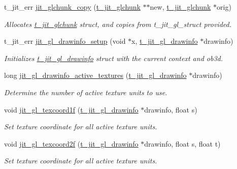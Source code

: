 \begin{DoxyCompactItemize}
t\_\-jit\_\-err \hyperlink{group__ob3dmod_gae9cc3acec721f3e56a41664b5891b900}{jit\_\-glchunk\_\-copy} (\hyperlink{structt__jit__glchunk}{t\_\-jit\_\-glchunk} $\ast$$\ast$new, \hyperlink{structt__jit__glchunk}{t\_\-jit\_\-glchunk} $\ast$orig)
\begin{DoxyCompactList}\small\item\em Allocates \hyperlink{structt__jit__glchunk}{t\_\-jit\_\-glchunk} struct, and copies from t\_\-jit\_\-gl\_\-struct provided. \item\end{DoxyCompactList}\item 
t\_\-jit\_\-err \hyperlink{group__ob3dmod_ga6b42cd2b3e58ff2c13d38b4bde52668d}{jit\_\-gl\_\-drawinfo\_\-setup} (void $\ast$x, \hyperlink{structt__jit__gl__drawinfo}{t\_\-jit\_\-gl\_\-drawinfo} $\ast$drawinfo)
\begin{DoxyCompactList}\small\item\em Initializes \hyperlink{structt__jit__gl__drawinfo}{t\_\-jit\_\-gl\_\-drawinfo} struct with the current context and ob3d. \item\end{DoxyCompactList}\item 
long \hyperlink{group__ob3dmod_gafebfd86239675c14e3a78a49b5a78e92}{jit\_\-gl\_\-drawinfo\_\-active\_\-textures} (\hyperlink{structt__jit__gl__drawinfo}{t\_\-jit\_\-gl\_\-drawinfo} $\ast$drawinfo)
\begin{DoxyCompactList}\small\item\em Determine the number of active texture units to use. \item\end{DoxyCompactList}\item 
void \hyperlink{group__ob3dmod_ga20352984f84477063544e3f2fa63dd78}{jit\_\-gl\_\-texcoord1f} (\hyperlink{structt__jit__gl__drawinfo}{t\_\-jit\_\-gl\_\-drawinfo} $\ast$drawinfo, float s)
\begin{DoxyCompactList}\small\item\em Set texture coordinate for all active texture units. \item\end{DoxyCompactList}\item 
void \hyperlink{group__ob3dmod_ga9d8dcc769098328f5177525fbc60c400}{jit\_\-gl\_\-texcoord2f} (\hyperlink{structt__jit__gl__drawinfo}{t\_\-jit\_\-gl\_\-drawinfo} $\ast$drawinfo, float s, float t)
\begin{DoxyCompactList}\small\item\em Set texture coordinate for all active texture units. \item\end{DoxyCompactList}\item 
$$
\end{DoxyCompactItemize}
